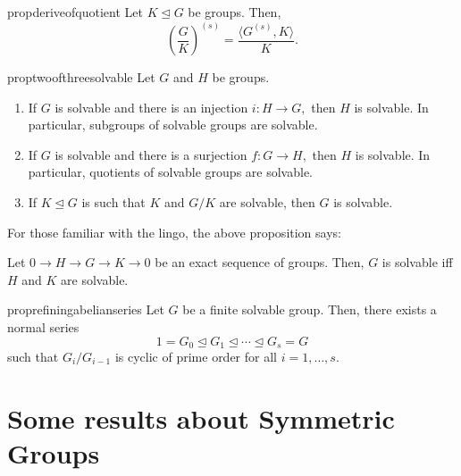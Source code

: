 \begin{restatable}[]{prop}{deriveofquotient}
\label{prop:deriveofquotient}
	Let $K \unlhd G$ be groups. Then,
	\begin{equation*} 
		\left(\frac{G}{K}\right)^{(s)} = \frac{\langle G^{(s)}, K\rangle}{K}.
	\end{equation*}
	\hfill\hyperref[prop:deriveofquotient2]{\downsym}
\end{restatable}

\begin{restatable}[]{prop}{twoofthreesolvable}
\label{prop:twoofthreesolvable}
	Let $G$ and $H$ be groups.
	\begin{enumerate}
	 	\item If $G$ is solvable and there is an injection $i : H \to G,$ then $H$ is solvable. In particular, subgroups of solvable groups are solvable.
	 	\item If $G$ is solvable and there is a surjection $f : G \to H,$ then $H$ is solvable. In particular, quotients of solvable groups are solvable.
	 	\item If $K \unlhd G$ is such that $K$ and $G/K$ are solvable, then $G$ is solvable. \hfill\hyperref[prop:twoofthreesolvable2]{\downsym}
	\end{enumerate} 
\end{restatable}

\begin{rem}
	For those familiar with the lingo, the above proposition says:

	Let $0 \to H \to G \to K \to 0$ be an exact sequence of groups. Then, $G$ is solvable iff $H$ and $K$ are solvable.
\end{rem}

\begin{restatable}[]{prop}{refiningabelianseries}
\label{prop:refiningabelianseries}
	Let $G$ be a finite solvable group. Then, there exists a normal series
	\begin{equation*} 
		1 = G_0 \unlhd G_1 \unlhd \cdots \unlhd G_s = G
	\end{equation*}
	such that $G_i/G_{i - 1}$ is cyclic of prime order for all $i = 1, \ldots, s.$ \hfill\hyperref[prop:refiningabelianseries2]{\downsym}
\end{restatable}

\section{Some results about Symmetric Groups}

